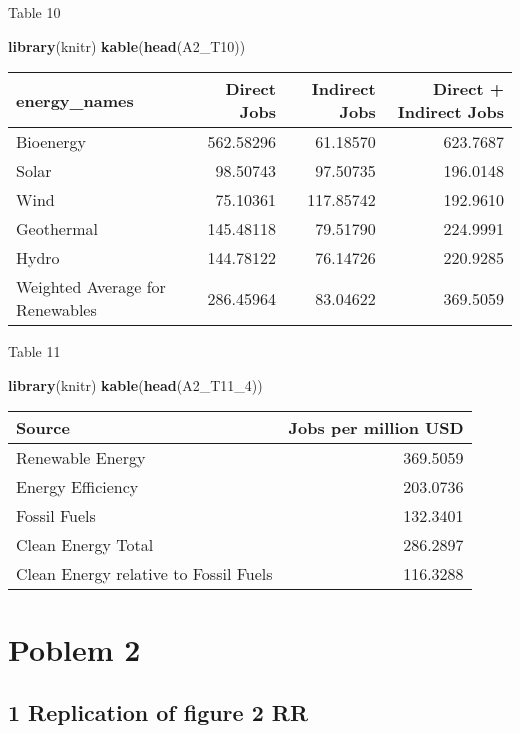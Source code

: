 \documentclass[
]{article}
\newenvironment{Shaded}{\begin{snugshade}}{\end{snugshade}}
\newcommand{\DecValTok}[1]{\textcolor[rgb]{0.00,0.00,0.81}{#1}}
\newcommand{\KeywordTok}[1]{\textcolor[rgb]{0.13,0.29,0.53}{\textbf{#1}}}
\newcommand{\NormalTok}[1]{#1}
\begin{document}
Table 10

\begin{Shaded}
\begin{Highlighting}[]
\KeywordTok{library}\NormalTok{(knitr)}
\KeywordTok{kable}\NormalTok{(}\KeywordTok{head}\NormalTok{(A2_T10))}
\end{Highlighting}
\end{Shaded}

\begin{longtable}[]{@{}lrrr@{}}
\toprule
energy\_names & Direct Jobs & Indirect Jobs & Direct + Indirect
Jobs\tabularnewline
\midrule
\endhead
Bioenergy & 562.58296 & 61.18570 & 623.7687\tabularnewline
Solar & 98.50743 & 97.50735 & 196.0148\tabularnewline
Wind & 75.10361 & 117.85742 & 192.9610\tabularnewline
Geothermal & 145.48118 & 79.51790 & 224.9991\tabularnewline
Hydro & 144.78122 & 76.14726 & 220.9285\tabularnewline
Weighted Average for Renewables & 286.45964 & 83.04622 &
369.5059\tabularnewline
\bottomrule
\end{longtable}

Table 11

\begin{Shaded}
\begin{Highlighting}[]
\KeywordTok{library}\NormalTok{(knitr)}
\KeywordTok{kable}\NormalTok{(}\KeywordTok{head}\NormalTok{(A2_T11_}\DecValTok{4}\NormalTok{))}
\end{Highlighting}
\end{Shaded}

\begin{longtable}[]{@{}lr@{}}
\toprule
Source & Jobs per million USD\tabularnewline
\midrule
\endhead
Renewable Energy & 369.5059\tabularnewline
Energy Efficiency & 203.0736\tabularnewline
Fossil Fuels & 132.3401\tabularnewline
Clean Energy Total & 286.2897\tabularnewline
Clean Energy relative to Fossil Fuels & 116.3288\tabularnewline
\bottomrule
\end{longtable}

\hypertarget{poblem-2}{%
\section{Poblem 2}\label{poblem-2}}

\hypertarget{replication-of-figure-2-rr}{%
\subsection{1 Replication of figure 2
RR}\label{replication-of-figure-2-rr}}
\end{document}
